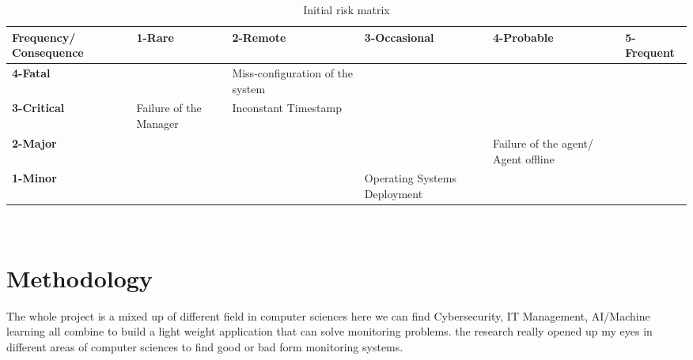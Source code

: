 \begin{table}[h]
\centering
\scriptsize
\caption{Initial risk matrix}
\begin{tabular}{|p{2cm}|p{2cm}|p{2cm}| p{2cm} |p{2cm}| p{2cm}|}
\hline \bf Frequency/ Consequence & \bf 1-Rare & \bf 2-Remote & \bf 3-Occasional & \bf 4-Probable & \bf 5-Frequent\\ [10pt]

\hline \bf 4-Fatal & \cellcolor{yellow!50} & \cellcolor{red!50} Miss-configuration  of the system & \cellcolor{red!50} & \cellcolor{red!50} &\cellcolor{red!50} \\ [10pt]

\hline \bf 3-Critical &\cellcolor{green!50} Failure of the Manager & \cellcolor{yellow!50} Inconstant Timestamp & \cellcolor{yellow!50}  & \cellcolor{red!50} &\cellcolor{red!50} \\ [10pt]

\hline \bf 2-Major & \cellcolor{green!50} & \cellcolor{green!50} & \cellcolor{yellow!50} &\cellcolor{yellow!50} Failure of the agent/ Agent offline &\cellcolor{red!50} \\ [10pt]

\hline \bf 1-Minor & \cellcolor{green!50} & \cellcolor{green!50} & \cellcolor{green!50}  Operating Systems Deployment &\cellcolor{yellow!50} &\cellcolor{yellow!50} \\ [10pt]
\hline
\end{tabular} \\
\label{tab:ProjRisks}
\end{table}







\section{Methodology}



The whole project is a mixed up of different field in computer sciences here we can find Cybersecurity, IT Management, AI/Machine learning all combine to build a light weight application that can solve monitoring problems. the research really opened up my eyes in different areas of computer sciences to find good or bad form monitoring systems.  

